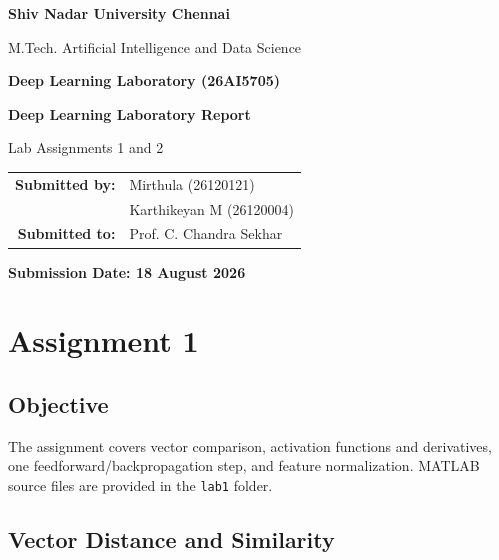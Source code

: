 \documentclass[11pt,a4paper]{article}
\renewcommand{\arraystretch}{1.18}
\begin{document}

\begin{titlepage}
    \centering
    {\LARGE\bfseries Shiv Nadar University Chennai\par}
    \vspace{0.4cm}
    {\large M.Tech. Artificial Intelligence and Data Science\par}
    \vspace{0.2cm}
    {\large\bfseries Deep Learning Laboratory (26AI5705)\par}

    \vfill
    {\Huge\bfseries Deep Learning Laboratory Report\par}
    \vspace{0.5cm}
    {\Large Lab Assignments 1 and 2\par}

    \vfill
    {\large
    \renewcommand{\arraystretch}{1.35}
    \begin{tabular}{@{}rl@{}}
        \textbf{Submitted by:} & Mirthula (26120121) \\
                               & Karthikeyan M (26120004) \\
        \textbf{Submitted to:} & Prof. C. Chandra Sekhar \\
    \end{tabular}\par}
    \vfill
    {\large\bfseries Submission Date: 18 August 2026\par}
\end{titlepage}

\tableofcontents
\clearpage
{}

\section{Assignment 1}
\setcounter{table}{0}
\setcounter{figure}{0}
\setcounter{equation}{0}

\subsection{Objective}
The assignment covers vector comparison, activation functions and derivatives, one feedforward/backpropagation step, and feature normalization. MATLAB source files are provided in the \texttt{lab1} folder.

\subsection{Vector Distance and Similarity}
\end{document}
